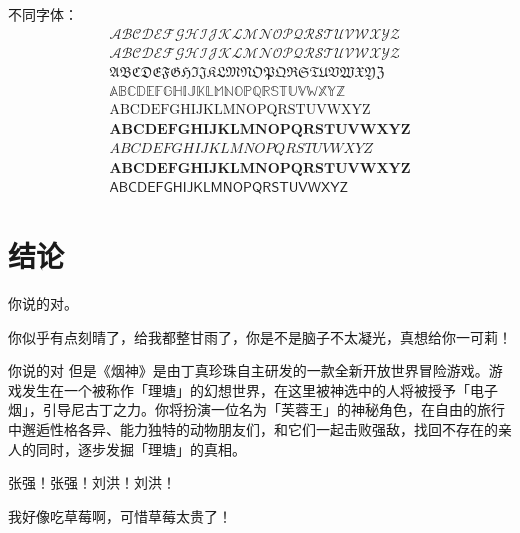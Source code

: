 不同字体：
\begin{equation}
\label{hello}
    \begin{array}{c}
        \mathscr{ABCDEFGHIJKLMNOPQRSTUVWXYZ} \\
        \mathcal{ABCDEFGHIJKLMNOPQRSTUVWXYZ} \\
        \mathfrak{ABCDEFGHIJKLMNOPQRSTUVWXYZ} \\
        \mathbb{ABCDEFGHIJKLMNOPQRSTUVWXYZ} \\
        \mathrm{ABCDEFGHIJKLMNOPQRSTUVWXYZ} \\
        \mathbf{ABCDEFGHIJKLMNOPQRSTUVWXYZ} \\
        ABCDEFGHIJKLMNOPQRSTUVWXYZ \\
        \boldsymbol{ABCDEFGHIJKLMNOPQRSTUVWXYZ} \\
        \mathsf{ABCDEFGHIJKLMNOPQRSTUVWXYZ}
    \end{array}
\end{equation}




\chapter*{结\quad 论}

你说的对。

你似乎有点刻晴了，给我都整甘雨了，你是不是脑子不太凝光，真想给你一可莉！

你说的对 但是《烟神》是由丁真珍珠自主研发的一款全新开放世界冒险游戏。游戏发生在一个被称作「理塘」的幻想世界，在这里被神选中的人将被授予「电子烟」，引导尼古丁之力。你将扮演一位名为「芙蓉王」的神秘角色，在自由的旅行中邂逅性格各异、能力独特的动物朋友们，和它们一起击败强敌，找回不存在的亲人的同时，逐步发掘「理塘」的真相。

张强！张强！刘洪！刘洪！

我好像吃草莓啊，可惜草莓太贵了！

